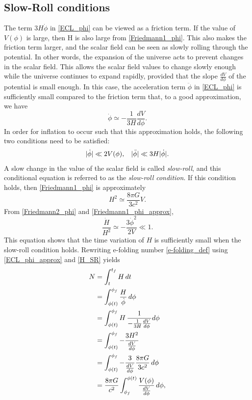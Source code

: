 \documentclass[12pt]{article}
\numberwithin{equation}{section}
\begin{document}
\subsection{Slow-Roll conditions}
The term $3H\dot{\phi}$ in \eqref{ECL_phi} can be viewed as a friction term. If the value of $V(\phi)$ is large, then H is also large from \eqref{Friedmann1_phi}. This also makes the friction term larger, and the scalar field can be seen as slowly rolling through the potential. In other words, the expansion of the universe acts to prevent changes in the scalar field. This allows the scalar field values to change slowly enough while the universe continues to expand rapidly, provided that the slope $\frac{dV}{d\phi}$ of the potential is small enough. In this case, the acceleration term $\ddot{\phi}$ in \eqref{ECL_phi} is sufficiently small compared to the friction term that, to a good approximation, we have
\begin{equation}\label{ECL_phi_approx}
    \dot{\phi} \simeq -\frac{1}{3H}\frac{dV}{d\phi}.
\end{equation}
In order for inflation to occur such that this approximation holds, the following two conditions need to be satisfied:
\begin{equation}\label{SR_condition}
    |\dot{\phi}| \ll 2V(\phi),\hspace{0.3cm} |\ddot{\phi}| \ll 3H|\dot{\phi}|.
\end{equation}
A slow change in the value of the scalar field is called \textit{slow-roll}, and this conditional equation is referred to as the \textit{slow-roll condition}. If this condition holds, then \eqref{Friedmann1_phi} is approximately
\begin{equation}\label{Friedmann1_phi_approx}
    H^2 \simeq \frac{8\pi G}{3c^2}V.
\end{equation}
From \eqref{Friedmann2_phi} and \eqref{Friedmann1_phi_approx},
\begin{equation}\label{H_SR}
    \frac{\dot{H}}{H^2} \simeq -\frac{3\dot{\phi}^2}{2V} \ll 1.
\end{equation}
This equation shows that the time variation of $H$ is sufficiently small when the slow-roll condition holds. Rewriting e-folding number \eqref{e-folding_def} using \eqref{ECL_phi_approx} and \eqref{H_SR} yields
\begin{align}\label{e-folding_phi}
    N &= \int_{t}^{t_f} H \,dt \notag\\
    &= \int_{\phi(t)}^{\phi_f} \frac{H}{\dot{\phi}} \,d\phi \notag\\
    &= \int_{\phi(t)}^{\phi_f} H \,\frac{1}{-\frac{1}{3H}\frac{dV}{d\phi}} d\phi \notag\\
    &= \int_{\phi(t)}^{\phi_f} -\frac{3H^2}{\frac{dV}{d\phi}} \notag\\
    &= \int_{\phi(t)}^{\phi_f} -\frac{3}{\frac{dV}{d\phi}}\frac{8\pi G}{3c^2}\, d\phi \notag\\
    &= \frac{8\pi G}{c^2} \int_{\phi_f}^{\phi(t)} \frac{V(\phi)}{\frac{dV}{d\phi}}\, d\phi,
\end{align}
\end{document}
